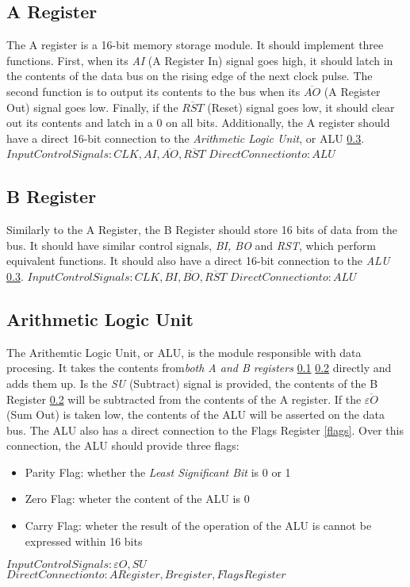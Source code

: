 \subsection{A Register} \label{a-reg}
The A register is a 16-bit memory storage module. It should implement three functions. First, when its \emph{AI}
(A Register In) signal goes high, it should latch in the contents of the data bus on the rising edge of the next clock pulse.
The second function is to output its contents to the bus when its \emph{$\overline{AO}$} (A Register Out) signal goes low. Finally,
if the \emph{$\overline{RST}$} (Reset) signal goes low, it should clear out its contents and latch in a 0 on all bits. Additionally,
the A register should have a direct 16-bit connection to the \emph{Arithmetic Logic Unit}, or ALU \ref{alu}. \\
\textbf{$Input Control Signals: CLK, AI, \overline{AO}, \overline{RST}$}
\textbf{$Direct Connection to: ALU$}

\subsection{B Register} \label{b-reg}
Similarly to the A Register, the B Register should store 16 bits of data from the bus. It should have similar control signals,
\emph{BI, BO} and \emph{RST}, which perform equivalent functions. It should also have a direct 16-bit connection to the \emph{ALU}
\ref{alu}.
\textbf{$Input Control Signals: CLK, BI, \overline{BO}, \overline{RST}$}
\textbf{$Direct Connection to: ALU$}

\subsection{Arithmetic Logic Unit} \label{alu}
The Arithemtic Logic Unit, or ALU, is the module responsible with data procesing. It takes the contents from\emph{both A and B
registers} \ref{a-reg} \ref{b-reg} directly and adds them up. Is the \emph{SU} (Subtract) signal is provided, the contents of the
B Register \ref{b-reg} will be subtracted from the contents of the A register. If the \emph{$\overline{\varepsilon O}$} (Sum Out)
is taken low, the contents of the  ALU will be asserted on the data bus. The ALU also has a direct connection to the Flags Register
\ref{flags}. Over this connection, the ALU should provide three flags:
\begin{itemize}
  \item Parity Flag: whether the \emph{Least Significant Bit} is 0 or 1
  \item Zero Flag: wheter the content of the ALU is 0
  \item Carry Flag: wheter the result of the operation of the ALU is cannot be expressed within 16 bits
\end{itemize}
\textbf{$Input Control Signals: \varepsilon O, SU$}
\textbf{$Direct Connection to: A Register, B register, Flags Register$}

